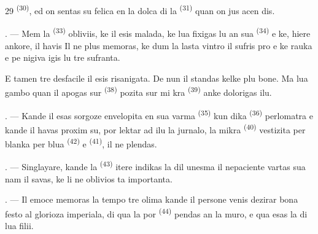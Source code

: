 \begin{VUpage}[31]{29}
\VUcontinue
{} \textsuperscript{(30)}, ed on sentas su felica en la\nl
dolca  di la  \textsuperscript{(31)} quan on jus acen\cc
dis.

\VUsaut{4.2mm}
\VUsaut{3.0mm}

. --- Mem la  \textsuperscript{(33)} obliviis, ke il esis\nl
malada, ke lua  fixigas lu an sua\nl
{} \textsuperscript{(34)} e ke, hiere ankore, il havis \nl
{} Il ne plus memoras, ke dum la lasta\nl
vintro il sufris pro  e ke rauka e pe\cc
nigiva  igis lu tre sufranta.

\VUblancAlinea
E tamen tre desfacile il esis risanigata. De\nl
nun il standas kelke plu bone. Ma lua gambo\nl
quan il apogas sur  \textsuperscript{(38)} pozita sur mi\cc
kra  \textsuperscript{(39)} anke dolorigas ilu.

. --- Kande il esas sorgoze envelopita en\nl
sua varma  \textsuperscript{(35)} kun dika \cc
{} \textsuperscript{(36)} perlomatra e kande il havas proxim\nl
su, por lektar ad ilu la jurnalo, la mikra \cc
{} \textsuperscript{(40)} vestizita per blanka  per blua\nl
{} \textsuperscript{(42)} e  \textsuperscript{(41)}, il ne plendas.

. --- Singlayare, kande la  \textsuperscript{(43)}\nl
itere indikas la  dil unesma  il\nl
nepaciente vartas sua  nam il savas, ke\nl
li ne oblivios ta  importanta.

. --- Il emoce memoras la tempo tre olima\nl
kande il persone venis dezirar bona festo al\nl
glorioza  imperiala, di qua la por\cc
{} \textsuperscript{(44)} pendas an la muro, e qua esas la\nl
{} di lua filii.

\VUsaut{6.0mm}
\VUfilet{22mm}
\end{VUpage}
